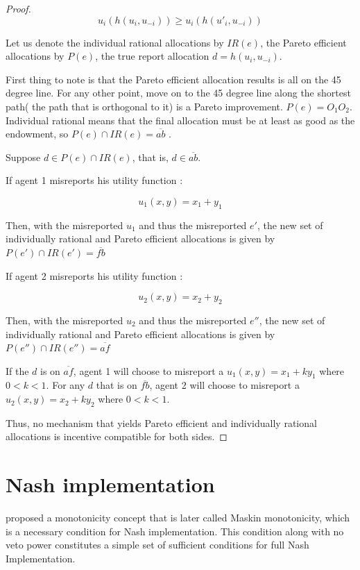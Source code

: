 \begin{proof}
\[ u_i(h(u_i, u_{-i})) \geq u_i(h(u'_i,u_{-i}))\]


Let us denote the individual rational allocations by $IR(e)$, the
Pareto efficient allocations by $P(e)$, the true report allocation
$d=h(u_i, u_{-i})$.

First thing to note is that the Pareto efficient allocation results is
all 
on the 45 degree line. For any other point, move on to the 45 degree
line along the shortest path( the path that is orthogonal to it) is a
Pareto improvement. $P(e)=O_1O_2$.  
Individual rational means that the final allocation must be at least
as good as the endowment, so $P(e) \cap IR(e) = \overline{ab}$ .

Suppose $d \in P(e) \cap IR(e)$, that is, $d \in \overline{ab}$.

If agent 1 misreports his utility function :

$$ u_1(x,y)=x_1 + y_1$$

Then, with the misreported $u_1$ and thus the misreported $e'$, the new set of individually rational and Pareto efficient allocations is given
by $P(e') \cap IR(e') = \overline{fb}$


If agent 2 misreports his utility function :

$$ u_2(x,y)=x_2 + y_2$$

Then, with the misreported $u_2$ and thus the misreported $e''$, the new set of individually rational and Pareto efficient allocations is given
by $P(e'') \cap IR(e'') = \overline{af}$

 If the $d$ is on $\overline{af}$, agent 1 will choose to
misreport a $u_1(x,y)=x_1 + ky_1$ where $0<k<1$. For any $d$ that is on $\overline{fb}$, agent 2 will choose to
misreport a $u_2(x,y)=x_2 + ky_2$ where $0<k<1$. 

Thus, no mechanism that yields Pareto efficient and individually rational allocations is
incentive compatible for both sides.


\end{proof}

\section{Nash implementation}
\parencite{Maskin1999} proposed a monotonicity concept that is later
called Maskin monotonicity, which is a necessary condition for Nash implementation. This condition along with no veto power
constitutes a simple set of  sufficient conditions 
for full Nash Implementation. 

